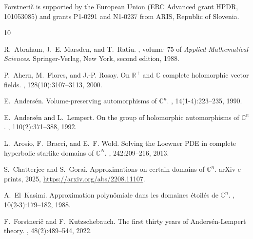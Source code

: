 \documentclass[12pt]{amsart}
\theoremstyle{definition}
\numberwithin{equation}{section}
\numberwithin{figure}{section}
\numberwithin{equation}{section}
\begin{document}
%
%
\smallskip
{} 
Forstneri\v c is supported by the European Union 
(ERC Advanced grant HPDR, 101053085) 
and grants P1-0291 and N1-0237 from ARIS, Republic of Slovenia. 




\begin{thebibliography}{10}

R.~Abraham, J.~E. Marsden, and T.~Ratiu.
, volume~75 of {\em
  Applied Mathematical Sciences}.
\newblock Springer-Verlag, New York, second edition, 1988.

P.~Ahern, M.~Flores, and J.-P. Rosay.
\newblock On {${\mathbb R}^+$} and {${\mathbb C}$} complete holomorphic vector
  fields.
, 128(10):3107--3113, 2000.

E.~Anders{\'e}n.
\newblock Volume-preserving automorphisms of {${\mathbb C}^n$}.
, 14(1-4):223--235, 1990.

E.~Anders{\'e}n and L.~Lempert.
\newblock On the group of holomorphic automorphisms of {${\mathbb C}^n$}.
, 110(2):371--388, 1992.

L.~Arosio, F.~Bracci, and E.~F. Wold.
\newblock Solving the {Loewner} {PDE} in complete hyperbolic starlike domains
  of {{\(\mathbb{C}^N\)}}.
, 242:209--216, 2013.

S.~Chatterjee and S.~Gorai.
\newblock Approximations on certain domains of $\mathbb{C}^{n}$.
\newblock arXiv e-prints, 2025, 
\url{https://arxiv.org/abs/2208.11107}.

A.~El~Kasimi.
\newblock Approximation polyn\^omiale dans les domaines \'etoil\'es de
  {${\mathbb C}^n$}.
, 10(2-3):179--182, 1988.

F.~Forstneri{\v{c}} and F.~Kutzschebauch.
\newblock The first thirty years of {Anders{\'e}n}-{Lempert} theory.
, 48(2):489--544, 2022.


\end{thebibliography}
\end{document}
